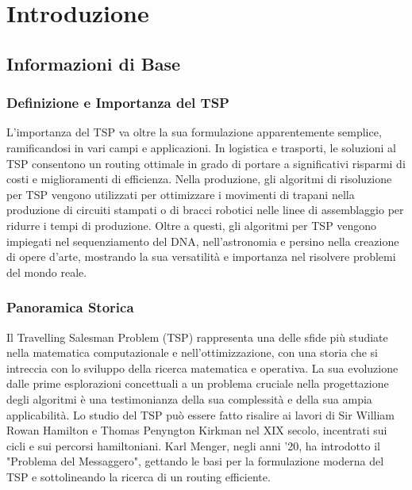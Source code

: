 
%

\chapter{Introduzione}
\label{chapt:1}


\epigraphfontsize{\small\itshape}
\setlength\epigraphwidth{12.5cm}
\setlength\epigraphrule{0pt}

\section{Informazioni di Base}

\subsection{Definizione e Importanza del TSP}

L'importanza del \gls{TSP} va oltre la sua formulazione apparentemente semplice, ramificandosi in vari campi e applicazioni. In logistica e trasporti, le
soluzioni al \gls{TSP} consentono un routing ottimale in grado di portare a
significativi risparmi di costi e miglioramenti di efficienza. Nella
produzione, gli algoritmi di risoluzione per \gls{TSP} vengono utilizzati per ottimizzare i
movimenti di trapani nella produzione di circuiti stampati o di bracci
robotici nelle linee di assemblaggio per ridurre i tempi di produzione.
Oltre a questi, gli algoritmi per \gls{TSP} vengono impiegati nel sequenziamento del
DNA, nell'astronomia e persino nella creazione di opere d'arte, mostrando
la sua versatilità e importanza nel risolvere problemi del mondo reale.

\subsection{Panoramica Storica}

Il Travelling Salesman Problem (\gls{TSP}) rappresenta una delle sfide più studiate nella matematica computazionale e nell'ottimizzazione, con una storia che si intreccia con lo sviluppo della ricerca matematica e operativa. La sua evoluzione dalle prime esplorazioni concettuali a un problema cruciale nella progettazione degli algoritmi è una testimonianza della sua complessità e della sua ampia applicabilità.
Lo studio del \gls{TSP} può essere fatto risalire ai lavori di Sir William Rowan Hamilton e Thomas Penyngton Kirkman nel XIX secolo, incentrati sui cicli e sui percorsi hamiltoniani. Karl Menger, negli anni '20, ha introdotto il "Problema del Messaggero", gettando le basi per la formulazione moderna del \gls{TSP} e sottolineando la ricerca di un routing efficiente.


